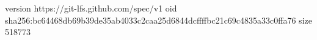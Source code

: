 version https://git-lfs.github.com/spec/v1
oid sha256:bc64468db69b39de35ab4033c2caa25d6844dcffffbc21c69c4835a33c0ffa76
size 518773
